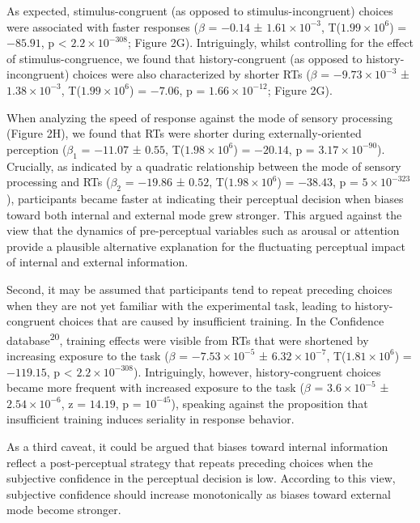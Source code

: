 \documentclass[
]{article}
\begin{document}
As expected, stimulus-congruent (as opposed to stimulus-incongruent)
choices were associated with faster responses (\(\beta\) = \(-0.14\) ±
\(\ensuremath{1.61\times 10^{-3}}\),
T(\(\ensuremath{1.99\times 10^{6}}\)) = \(-85.91\), p < \(\ensuremath{2.2\times 10^{-308}}\); Figure
2G). Intriguingly, whilst controlling for the effect of
stimulus-congruence, we found that history-congruent (as opposed to
history-incongruent) choices were also characterized by shorter RTs
(\(\beta\) = \(\ensuremath{-9.73\times 10^{-3}}\) ±
\(\ensuremath{1.38\times 10^{-3}}\),
T(\(\ensuremath{1.99\times 10^{6}}\)) = \(-7.06\), p =
\(\ensuremath{1.66\times 10^{-12}}\); Figure 2G).

When analyzing the speed of response against the mode of sensory
processing (Figure 2H), we found that RTs were shorter during
externally-oriented perception (\(\beta_1\) = \(-11.07\) ± \(0.55\),
T(\(\ensuremath{1.98\times 10^{6}}\)) = \(-20.14\), p =
\(\ensuremath{3.17\times 10^{-90}}\)). Crucially, as indicated by a
quadratic relationship between the mode of sensory processing and RTs
(\(\beta_2\) = \(-19.86\) ± \(0.52\),
T(\(\ensuremath{1.98\times 10^{6}}\)) = \(-38.43\), p =
\(\ensuremath{5\times 10^{-323}}\)), participants became faster at
indicating their perceptual decision when biases toward both internal
and external mode grew stronger. This argued against the view that the
dynamics of pre-perceptual variables such as arousal or attention
provide a plausible alternative explanation for the fluctuating
perceptual impact of internal and external information.

Second, it may be assumed that participants tend to repeat preceding
choices when they are not yet familiar with the experimental task,
leading to history-congruent choices that are caused by insufficient
training. In the Confidence database\textsuperscript{20}, training
effects were visible from RTs that were shortened by increasing exposure
to the task (\(\beta\) = \(\ensuremath{-7.53\times 10^{-5}}\) ±
\(\ensuremath{6.32\times 10^{-7}}\),
T(\(\ensuremath{1.81\times 10^{6}}\)) = \(-119.15\), p < \(\ensuremath{2.2\times 10^{-308}}\)).
Intriguingly, however, history-congruent choices became more frequent
with increased exposure to the task (\(\beta\) =
\(\ensuremath{3.6\times 10^{-5}}\) ±
\(\ensuremath{2.54\times 10^{-6}}\), z = \(14.19\), p =
\(\ensuremath{10^{-45}}\)), speaking against the proposition that
insufficient training induces seriality in response behavior.

As a third caveat, it could be argued that biases toward internal
information reflect a post-perceptual strategy that repeats preceding
choices when the subjective confidence in the perceptual decision is
low. According to this view, subjective confidence should increase
monotonically as biases toward external mode become stronger.
\end{document}
